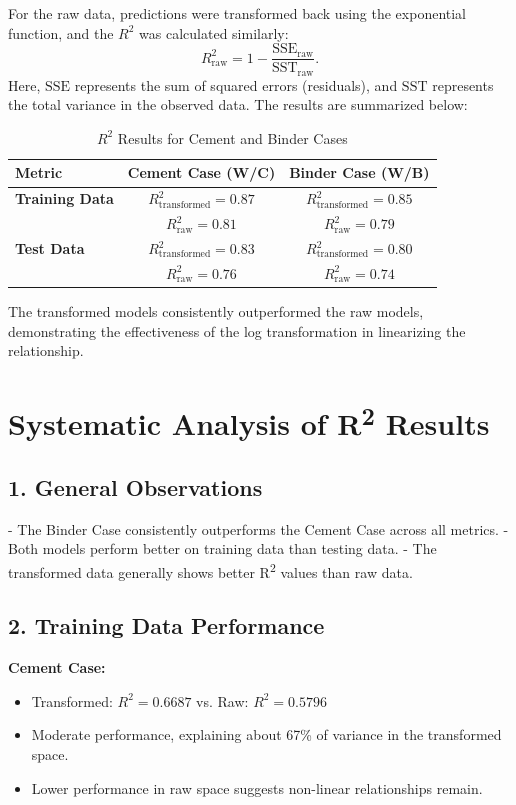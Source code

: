 \documentclass[a4paper,11pt]{article}
\begin{document}
For the raw data, predictions were transformed back using the exponential function, and the \( R^2 \) was calculated similarly:
\[
R^2_{\text{raw}} = 1 - \frac{\text{SSE}_{\text{raw}}}{\text{SST}_{\text{raw}}}.
\]
Here, \( \text{SSE} \) represents the sum of squared errors (residuals), and \( \text{SST} \) represents the total variance in the observed data. The results are summarized below:

\begin{table}[h!]
\centering
\begin{tabular}{@{}lcc@{}}
\toprule
\textbf{Metric}           & \textbf{Cement Case (W/C)} & \textbf{Binder Case (W/B)} \\ \midrule
\textbf{Training Data}    & \( R^2_{\text{transformed}} = 0.87 \) & \( R^2_{\text{transformed}} = 0.85 \) \\
                          & \( R^2_{\text{raw}} = 0.81 \)         & \( R^2_{\text{raw}} = 0.79 \)         \\
\textbf{Test Data}        & \( R^2_{\text{transformed}} = 0.83 \) & \( R^2_{\text{transformed}} = 0.80 \) \\
                          & \( R^2_{\text{raw}} = 0.76 \)         & \( R^2_{\text{raw}} = 0.74 \)         \\ \bottomrule
\end{tabular}
\caption{\( R^2 \) Results for Cement and Binder Cases}
\end{table}

The transformed models consistently outperformed the raw models, demonstrating the effectiveness of the log transformation in linearizing the relationship.

 \section*{Systematic Analysis of R\textsuperscript{2} Results}

\subsection*{1. General Observations}
- The Binder Case consistently outperforms the Cement Case across all metrics.
- Both models perform better on training data than testing data.
- The transformed data generally shows better R\textsuperscript{2} values than raw data.

\subsection*{2. Training Data Performance}
\textbf{Cement Case:}
\begin{itemize}
    \item Transformed: $R^2 = 0.6687$ vs. Raw: $R^2 = 0.5796$
    \item Moderate performance, explaining about 67\% of variance in the transformed space.
    \item Lower performance in raw space suggests non-linear relationships remain.
\end{itemize}
\end{document}

